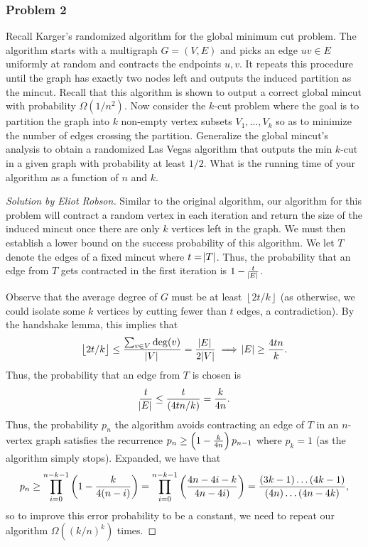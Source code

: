 \documentclass{article}
\newenvironment{solution}[1]{\begin{proof}[Solution by #1]}{\end{proof}}
\newcommand{\floor}[1]{\left\lfloor#1\right\rfloor} %
\begin{document}
\subsubsection{Problem 2}
Recall Karger's randomized algorithm for the global minimum cut problem. The algorithm starts with a multigraph \(G = (V,E)\) and picks an edge \(uv \in E\) uniformly at random and contracts the endpoints \(u,v\). It repeats this procedure until the graph has exactly two nodes left and outputs the induced partition as the mincut. Recall that this algorithm is shown to output a correct global mincut with probability \(\Omega(1 / n^2)\). Now consider the \(k\)-cut problem where the goal is to partition the graph into \(k\) non-empty vertex subsets \(V_1, \dots, V_k\) so as to minimize the number of edges crossing the partition. Generalize the global mincut's analysis to obtain a randomized Las Vegas algorithm that outputs the min \(k\)-cut in a given graph with probability at least \(1/2\). What is the running time of your algorithm as a function of \(n\) and \(k\).

\begin{solution}{Eliot Robson}
    Similar to the original algorithm, our algorithm for this problem will contract a random vertex in each iteration and return the size of the induced mincut once there are only \(k\) vertices left in the graph. We must then establish a lower bound on the success probability of this algorithm. We let \(T\) denote the edges of a fixed mincut where \(t = \abs{T}\). Thus, the probability that an edge from \(T\) gets contracted in the first iteration is \(1 - \frac{t}{\abs{E}}\).
    
    Observe that the average degree of \(G\) must be at least \(\floor{2t/k}\) (as otherwise, we could isolate some \(k\) vertices by cutting fewer than \(t\) edges, a contradiction). By the handshake lemma, this implies that
    \[
        \floor{2t/k}
        \leq%
        \frac{\sum_{v \in V} \deg(v)}{\abs{V}}
        =%
        \frac{\abs{E}}{2 \abs{V}}
        \implies%
        \abs{E}
        \geq%
        \frac{4 t n}{k}.
    \]
    Thus, the probability that an edge from \(T\) is chosen is
    \[
        \frac{t}{\abs{E}}
        \leq%
        \frac{t}{(4 t n / k)}
        =%
        \frac{k}{4 n}.
    \]
    Thus, the probability \(p_n\) the algorithm avoids contracting an edge of \(T\) in an \(n\)-vertex graph satisfies the recurrence \(p_n \geq \del{1 - \frac{k}{4 n}} p_{n-1}\) where \(p_k = 1\) (as the algorithm simply stops). Expanded, we have that
    \[
        p_n
        \geq%
        \prod_{i=0}^{n-k-1} \del{1 - \frac{k}{4 (n-i)}}
        =%
        \prod_{i=0}^{n-k-1} \del{\frac{4n - 4i - k}{4n - 4i)}}
        =%
        \frac{(3k-1) \dots (4k-1)}{(4n) \dots (4n - 4k)},
    \]
    so to improve this error probability to be a constant, we need to repeat our algorithm \(\Omega((k/n)^k)\) times.
\end{solution}
\end{document}
